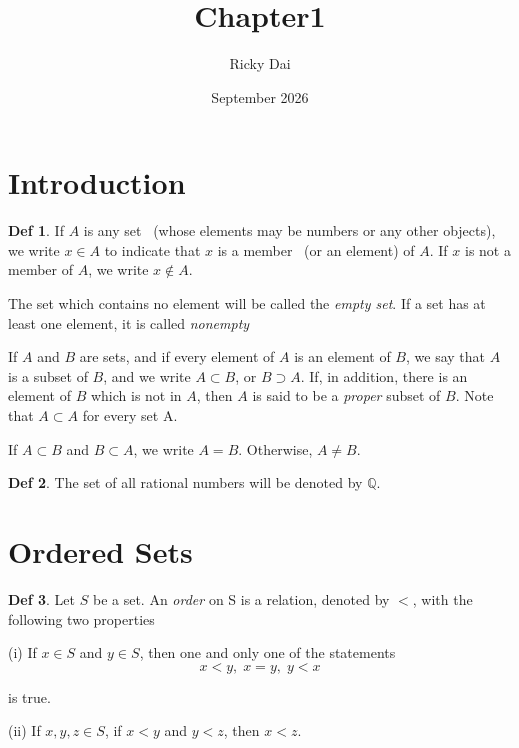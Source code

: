 \documentclass{article}
\title{Chapter1}
\author{Ricky Dai}
\date{September 2026}
\theoremstyle{definition}
\newtheorem{definition}{Def}
\begin{document}
\maketitle

\section{Introduction}
\begin{definition}
    If $A$ is any set \, (whose elements may be numbers or any other objects), we write $x \in A$ to indicate that $x$ is a member \, (or an element) of $A$. If $x$ is not a member of $A$, we write $x \notin A$.\par
    The set which contains no element will be called the \textit{empty set}. If a set has at least one element, it is called \textit{nonempty}\par
    If $A$ and $B$ are sets, and if every element of $A$ is an element of $B$, we say that $A$ is a subset of $B$, and we write $A \subset B$, or $B \supset A$. If, in addition, there is an element of $B$ which is not in $A$, then $A$ is said to be a \textit{proper} subset of $B$. Note that $A \subset A$ for every set A.\par
    If $A \subset B$ and $B \subset A$, we write $A = B$. Otherwise, $A \neq B$.
\end{definition}

\begin{definition}
    The set of all rational numbers will be denoted by $\mathbb{Q}$.
\end{definition}

\section{Ordered Sets}
\begin{definition}
    Let $S$ be a set. An \textit{order} on S is a relation, denoted by $<$, with the following two properties \par
    (i) If $x \in S$ and $y \in S$, then one and only one of the statements
    \[
    x < y,\;x = y,\;y < x
    \]\par
    is true. \par
    (ii) If $x, y, z \in S$, if $x < y$ and $y < z$, then $x < z$.
\end{definition}
\end{document}
